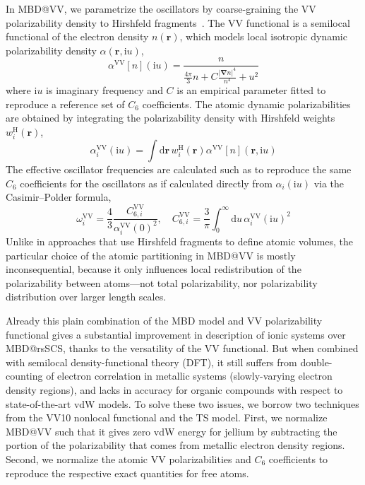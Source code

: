 In MBD@VV, we parametrize the oscillators by coarse-graining the VV polarizability density to Hirshfeld fragments~\citep{HirshfeldTCA77,SatoJCP09,SatoJCP10}.
The VV functional is a semilocal functional of the electron density $n(\mathbf r)$, which models local isotropic dynamic polarizability density $\alpha(\mathbf r,\mathrm iu)$,
\begin{equation}
   \alpha^\text{VV}[n](\mathrm iu)=\frac{n}{\frac{4\pi}3n+C\frac{|\boldsymbol\nabla n|^4}{n^4}+u^2}
   \label{eq:vv-functional}
\end{equation}
where $\mathrm iu$ is imaginary frequency and $C$ is an empirical parameter fitted to reproduce a reference set of $C_6$ coefficients.
The atomic dynamic polarizabilities are obtained by integrating the polarizability density with Hirshfeld weights $w_i^\text{H}(\mathbf r)$,
\begin{equation}
  \alpha_i^\text{VV}(\mathrm iu)=\int\mathrm d\mathbf r\,w_i^\text{H}(\mathbf r)\alpha^\text{VV}[n](\mathbf r,\mathrm iu)
\end{equation}
The effective oscillator frequencies are calculated such as to reproduce the same $C_6$ coefficients for the oscillators as if calculated directly from $\alpha_i(\mathrm iu)$ via the Casimir--Polder formula,
\begin{equation}
  \omega_i^\text{VV}=\frac43\frac{C_{6,i}^\text{VV}}{\alpha_i^\text{VV}{(0)}^2},\quad
  C_{6,i}^\text{VV}=\frac3\pi\int_0^\infty\mathrm du\,\alpha_i^\text{VV}{(\mathrm iu)}^2
\end{equation}
Unlike in approaches that use Hirshfeld fragments to define atomic volumes, the particular choice of the atomic partitioning in MBD@VV is mostly inconsequential, because it only influences local redistribution of the polarizability between atoms---not total polarizability, nor polarizability distribution over larger length scales.

Already this plain combination of the MBD model and VV polarizability functional gives a substantial improvement in description of ionic systems over MBD@rsSCS, thanks to the versatility of the VV functional.
But when combined with semilocal density-functional theory (DFT), it still suffers from double-counting of electron correlation in metallic systems (slowly-varying electron density regions), and lacks in accuracy for organic compounds with respect to state-of-the-art vdW models.
To solve these two issues, we borrow two techniques from the VV10 nonlocal functional and the TS model.
First, we normalize MBD@VV such that it gives zero vdW energy for jellium by subtracting the portion of the polarizability that comes from metallic electron density regions.
Second, we normalize the atomic VV polarizabilities and $C_6$ coefficients to reproduce the respective exact quantities for free atoms.

